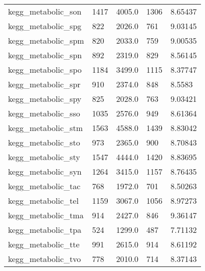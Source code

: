 \begin{longtable}{lllll}
 kegg\_metabolic\_son                                 & 1417       & 4005.0      & 1306  & 8.65437    \\
 kegg\_metabolic\_spg                                 & 822        & 2026.0      & 761   & 9.03145    \\
 kegg\_metabolic\_spm                                 & 820        & 2033.0      & 759   & 9.00535    \\
 kegg\_metabolic\_spn                                 & 892        & 2319.0      & 829   & 8.56145    \\
 kegg\_metabolic\_spo                                 & 1184       & 3499.0      & 1115  & 8.37747    \\
 kegg\_metabolic\_spr                                 & 910        & 2374.0      & 848   & 8.5583     \\
 kegg\_metabolic\_spy                                 & 825        & 2028.0      & 763   & 9.03421    \\
 kegg\_metabolic\_sso                                 & 1035       & 2576.0      & 949   & 8.61364    \\
 kegg\_metabolic\_stm                                 & 1563       & 4588.0      & 1439  & 8.83042    \\
 kegg\_metabolic\_sto                                 & 973        & 2365.0      & 900   & 8.70843    \\
 kegg\_metabolic\_sty                                 & 1547       & 4444.0      & 1420  & 8.83695    \\
 kegg\_metabolic\_syn                                 & 1264       & 3415.0      & 1157  & 8.76435    \\
 kegg\_metabolic\_tac                                 & 768        & 1972.0      & 701   & 8.50263    \\
 kegg\_metabolic\_tel                                 & 1159       & 3067.0      & 1056  & 8.97273    \\
 kegg\_metabolic\_tma                                 & 914        & 2427.0      & 846   & 9.36147    \\
 kegg\_metabolic\_tpa                                 & 524        & 1299.0      & 487   & 7.71132    \\
 kegg\_metabolic\_tte                                 & 991        & 2615.0      & 914   & 8.61192    \\
 kegg\_metabolic\_tvo                                 & 778        & 2010.0      & 714   & 8.37143    \\

\end{longtable}
